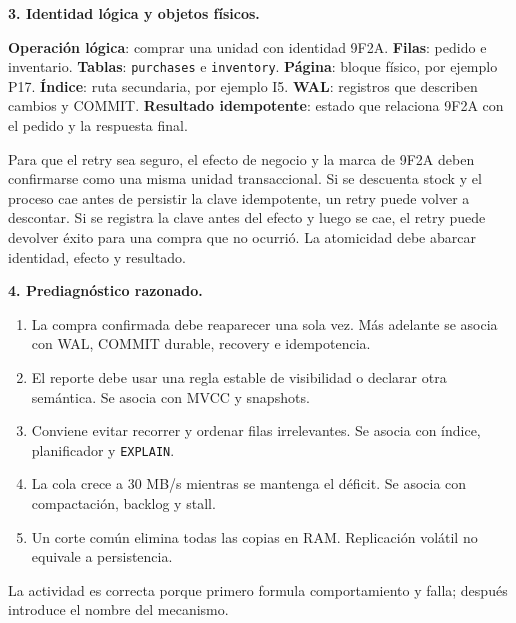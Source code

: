 \documentclass[variant=guiaresuelta,cover=institutional,mode=screen]{ua-engineering-v6-article}
\begin{document}
\begin{uaexercise}
\textbf{3. Identidad lógica y objetos físicos.}
\end{uaexercise}
\begin{uaanswer}
\textbf{Operación lógica}: comprar una unidad con identidad 9F2A. \textbf{Filas}: pedido e inventario. \textbf{Tablas}: \texttt{purchases} e \texttt{inventory}. \textbf{Página}: bloque físico, por ejemplo P17. \textbf{Índice}: ruta secundaria, por ejemplo I5. \textbf{WAL}: registros que describen cambios y COMMIT. \textbf{Resultado idempotente}: estado que relaciona 9F2A con el pedido y la respuesta final.

Para que el retry sea seguro, el efecto de negocio y la marca de 9F2A deben confirmarse como una misma unidad transaccional. Si se descuenta stock y el proceso cae antes de persistir la clave idempotente, un retry puede volver a descontar. Si se registra la clave antes del efecto y luego se cae, el retry puede devolver éxito para una compra que no ocurrió. La atomicidad debe abarcar identidad, efecto y resultado.
\end{uaanswer}

\begin{uaexercise}
\textbf{4. Prediagnóstico razonado.}
\end{uaexercise}
\begin{uaanswer}
\begin{enumerate}
\item La compra confirmada debe reaparecer una sola vez. Más adelante se asocia con WAL, COMMIT durable, recovery e idempotencia.
\item El reporte debe usar una regla estable de visibilidad o declarar otra semántica. Se asocia con MVCC y snapshots.
\item Conviene evitar recorrer y ordenar filas irrelevantes. Se asocia con índice, planificador y \texttt{EXPLAIN}.
\item La cola crece a 30 MB/s mientras se mantenga el déficit. Se asocia con compactación, backlog y stall.
\item Un corte común elimina todas las copias en RAM. Replicación volátil no equivale a persistencia.
\end{enumerate}

La actividad es correcta porque primero formula comportamiento y falla; después introduce el nombre del mecanismo.
\end{uaanswer}
\end{document}
